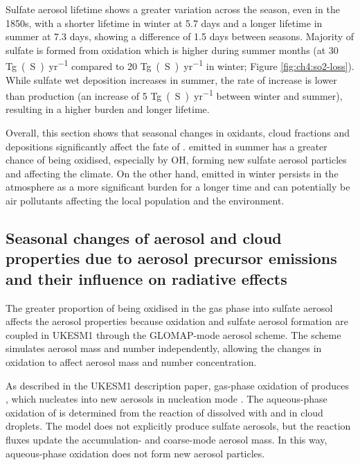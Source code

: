 Sulfate aerosol lifetime shows a greater variation across the season, even in the 1850s, with a shorter lifetime in winter at 5.7 days and a longer lifetime in summer at 7.3 days, showing a difference of 1.5 days between seasons. Majority of sulfate is formed from  oxidation which is higher during summer months (at 30 \unit{Tg(S)~yr^{-1}} compared to 20 \unit{Tg(S)~yr^{-1}} in winter; Figure \ref{fig:ch4:so2-loss}). While sulfate wet deposition increases in summer, the rate of increase is lower than production (an increase of 5 \unit{Tg(S)~yr^{-1}} between winter and summer), resulting in a higher burden and longer lifetime. 

Overall, this section shows that seasonal changes in oxidants, cloud fractions and depositions significantly affect the fate of .  emitted in summer has a greater chance of being oxidised, especially by OH, forming new sulfate aerosol particles and affecting the climate. On the other hand,  emitted in winter persists in the atmosphere as a more significant burden for a longer time and can potentially be air pollutants affecting the local population and the environment. 

\subsection{Seasonal changes of aerosol and cloud properties due to aerosol precursor emissions and their influence on radiative effects}

The greater proportion of  being oxidised in the gas phase into sulfate aerosol affects the aerosol properties because  oxidation and sulfate aerosol formation are coupled in UKESM1 through the GLOMAP-mode aerosol scheme. The scheme simulates aerosol mass and number independently, allowing the changes in oxidation to affect aerosol mass and number concentration. 

As described in the UKESM1 description paper, gas-phase oxidation of  produces , which nucleates into new aerosols in nucleation mode \citep{mulcahyDescriptionEvaluationAerosol2020}. The aqueous-phase oxidation of  is determined from the reaction of dissolved  with  and  in cloud droplets. The model does not explicitly produce sulfate aerosols, but the reaction fluxes update the accumulation- and coarse-mode aerosol mass. In this way, aqueous-phase oxidation does not form new aerosol particles.

